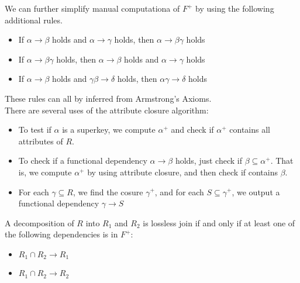 \documentclass{article}
\begin{document}
We can further simplify manual computationa of $F^{+}$ by using the following additional rules. 
\begin{itemize}
  \item If $\alpha \rightarrow \beta$ holds and $\alpha \rightarrow \gamma$ holds, then $\alpha \rightarrow \beta\gamma$ holds \hfill {}
  \item If $\alpha \rightarrow \beta\gamma$ holds, then $\alpha \rightarrow \beta$ holds and $\alpha \rightarrow \gamma$ holds \hfill {}  
  \item If $\alpha \rightarrow \beta$ holds and $\gamma\beta \rightarrow \delta$ holds, then $\alpha \gamma \rightarrow \delta$ holds \hfill {}
\end{itemize}
These rules can all by inferred from Armstrong's Axioms. \\ 

There are several uses of the attribute closure algorithm:
\begin{itemize} 
  \item To test if $\alpha$ is a superkey, we compute $\alpha^{+}$ and check if $\alpha^{+}$ contains all attributes of $R$. 
  \item To check if a functional dependency $\alpha \rightarrow \beta$ holds, just check if $\beta \subseteq \alpha^{+}$. That is, we compute $\alpha^{+}$ by using attribute closure, and then check if contains $\beta$. 
  \item For each $\gamma \subseteq R$, we find the cosure $\gamma^{+}$, and for each $S \subseteq \gamma^{+}$, we output a functional dependency $\gamma \rightarrow S$
\end{itemize}

\begin{definition}
  A decomposition of $R$ into $R_1$ and $R_2$ is lossless join if and only if at least one of the following dependencies is in $F^{+}$: 
  \begin{itemize}
    \item $R_1 \cap R_2 \rightarrow R_1$ 
    \item $R_1 \cap R_2 \rightarrow R_2$
  \end{itemize}
\end{definition}
\end{document}
